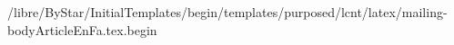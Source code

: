 /libre/ByStar/InitialTemplates/begin/templates/purposed/lcnt/latex/mailing-bodyArticleEnFa.tex.begin
